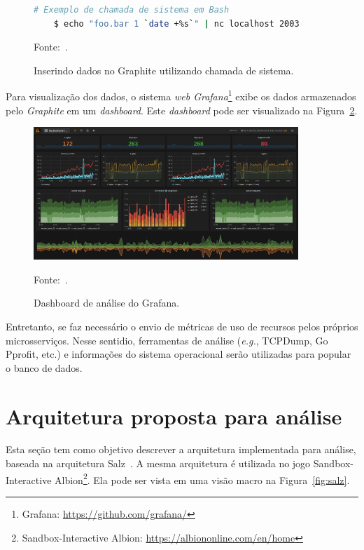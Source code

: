 \begin{figure}[htb!]
  \caption{Inserindo dados no Graphite utilizando chamada de sistema.}
  \label{fig:graphite}
  \begin{lstlisting}[language=bash]
    # Exemplo de chamada de sistema em Bash
    $ echo "foo.bar 1 `date +%s`" | nc localhost 2003
  \end{lstlisting}
  \centering

  Fonte:~\cite{graphite}.
\end{figure}

Para visualização dos dados, o sistema \textit{web Grafana}\footnote{Grafana: \url{https://github.com/grafana/}} exibe os dados armazenados pelo \textit{Graphite} em um \textit{dashboard}.
%
Este \textit{dashboard} pode ser visualizado na Figura~\ref{fig:grafana}.


\begin{figure}[htb!]
  \caption{Dashboard de análise do Grafana.}
  \label{fig:grafana}
  \includegraphics[height=5cm]{img/cap3/grafana.png}
  \centering

  Fonte:~\cite{grafana}.
\end{figure}

Entretanto, se faz necessário o envio de métricas de uso de recursos pelos próprios microsserviços.
%
Nesse sentidio, ferramentas de análise (\textit{e.g.}, TCPDump, Go Pprofit, etc.) e informações do sistema operacional serão utilizadas para popular o banco de dados.


\section{Arquitetura proposta para análise}
\label{sec:arquitetura_proposta}

Esta seção tem como objetivo descrever a arquitetura implementada para análise, baseada na arquitetura Salz~\cite{albion_online_unite}.
%
A mesma arquitetura é utilizada no jogo Sandbox-Interactive Albion\footnote{Sandbox-Interactive Albion: \url{https://albiononline.com/en/home}}.
%
Ela pode ser vista em uma visão macro na Figura~\ref{fig:salz}.


